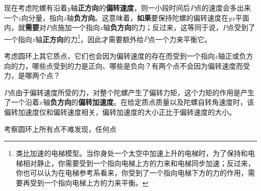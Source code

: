 现在考虑陀螺有沿着$y$轴\textbf{正方向}的\textbf{偏转速度}，则一小段时间后$P$点的速度会多出来一个$z$向分量，指向$z$轴\textbf{负方向}。这意味着，\textbf{如果}要保持陀螺的偏转速度在$yz$平面内，就\textbf{需要}对$P$点施加一个指向$z$轴\textbf{负方向}的力；反过来，这等同于说，$P$点受到了一个指向$z$轴\textbf{正方向}的力\footnote{类比加速的电梯模型。当你身处一个太空中加速上升的电梯时，为了保持和电梯相对静止，你需要受到一个指向电梯上方的力来和电梯同步加速；反过来，你也可以认为在电梯参考系看来，你受到了一个指向电梯下方的力的作用，需要再受到一个指向电梯上方的力来平衡。}，因此才需要额外给$P$点一个力来平衡它。

\begin{exercise}{}
考虑圆环上其它质点，它们也会因为偏转速度的存在而受到一个指向$z$轴正或负方向的力，哪些点受到的力是正向、哪些是负向？有两个点不会因为偏转速度而受力，是哪两个点？
\end{exercise}


$P$点由于偏转速度所受的力，对整个陀螺产生了偏转力矩，这个力矩的作用是产生了一个沿着$x$轴\textbf{负方向}的\textbf{偏转加速度}。在给定质点质量以及陀螺自转角速度时，该偏转加速度仅和偏转速度相关，偏转加速度的大小正比于偏转速度的大小。

考察圆环上所有点不难发现，任何点









